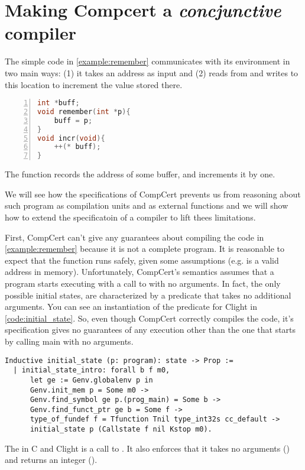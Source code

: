 \chapter{Making Compcert a \emph{concjunctive} compiler }\label{ch:compcert}

The simple code in \ref{example:remember} communicates with its environment in two main ways: (1) it takes an address as input and (2) reads from and writes to this location to increment the value stored there.
\begin{table}\begin{lstlisting}[language=C, numbers=left]
int *buff;
void remember(int *p){
    buff = p;
}
void incr(void){
    ++(* buff);
}
\end{lstlisting}
\caption{The function  records the address of some buffer, and  increments it by one. }
\label{example:remember}
\end{table}
We will see how the specifications of CompCert prevents us from reasoning about such program as compilation units and as external functions and we will show how to extend the specificatoin of a compiler to lift thees limitations.

First, CompCert can't give any guarantees about compiling the code in \ref{example:remember} because it is not a complete program. It is reasonable to expect that the function  runs safely, given some assumptions (e.g.  is a valid address in memory). Unfortunately, CompCert's semantics assumes that a program starts executing with a call to   with no arguments. In fact, the only possible initial states, are characterized by a predicate  that takes no additional arguments. You can see an instantiation of the predicate for Clight in \ref{code:initial_state}. So, even though CompCert correctly compiles the code, it's specification gives no guarantees of any execution other than the one that starts by calling main with no arguments.
\begin{table}
\begin{lstlisting}
Inductive initial_state (p: program): state -> Prop :=
  | initial_state_intro: forall b f m0,
      let ge := Genv.globalenv p in
      Genv.init_mem p = Some m0 ->
      Genv.find_symbol ge p.(prog_main) = Some b ->
      Genv.find_funct_ptr ge b = Some f ->
      type_of_fundef f = Tfunction Tnil type_int32s cc_default ->
      initial_state p (Callstate f nil Kstop m0).
\end{lstlisting}
\caption{The  in C and Clight is a call to . It also enforces that it takes no arguments () and returns an integer ().}\label{code:initial_state}
\end{table}

